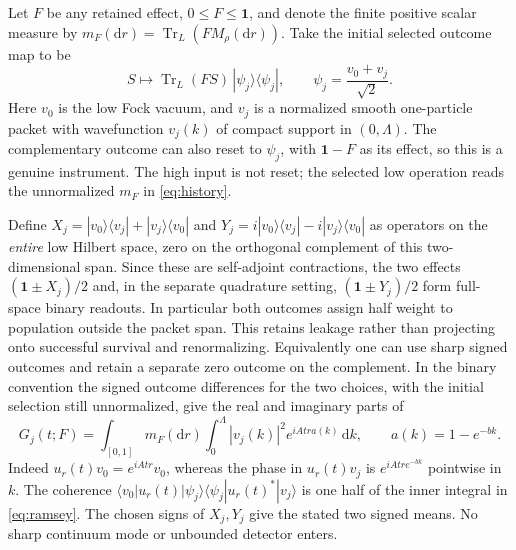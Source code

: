 \documentclass[11pt]{article}
\newcommand{\tr}{\operatorname{Tr}}
\newcommand{\dd}{\mathrm d}
\newcommand{\one}{\mathbf 1}
\newcommand{\vac}{v_0}
\newcommand{\ketbra}[2]{|#1\rangle\langle #2|}
\begin{document}
Let \(F\) be any retained effect, \(0\leq F\leq \one\), and denote the finite positive scalar measure by \(m_F(\dd r)=\tr_L(FM_\rho(\dd r))\). Take the initial selected outcome map to be
\begin{equation}
 S\longmapsto \tr_L(FS)\,\ketbra{\psi_j}{\psi_j},\qquad
 \psi_j=\frac{\vac+v_j}{\sqrt2}.
 \label{eq:reset}
\end{equation}
Here \(\vac\) is the low Fock vacuum, and \(v_j\) is a normalized smooth one-particle packet with wavefunction \(v_j(k)\) of compact support in \((0,\Lambda)\). The complementary outcome can also reset to \(\psi_j\), with \(\one-F\) as its effect, so this is a genuine instrument. The high input is not reset; the selected low operation reads the unnormalized \(m_F\) in \eqref{eq:history}.

Define \(X_j=\ketbra{\vac}{v_j}+\ketbra{v_j}{\vac}\) and
\(Y_j=i\ketbra{\vac}{v_j}-i\ketbra{v_j}{\vac}\) as operators on the \emph{entire} low Hilbert space, zero on the orthogonal complement of this two-dimensional span. Since these are self-adjoint contractions, the two effects \((\one\pm X_j)/2\) and, in the separate quadrature setting, \((\one\pm Y_j)/2\) form full-space binary readouts. In particular both outcomes assign half weight to population outside the packet span. This retains leakage rather than projecting onto successful survival and renormalizing. Equivalently one can use sharp signed outcomes and retain a separate zero outcome on the complement. In the binary convention the signed outcome differences for the two choices, with the initial selection still unnormalized, give the real and imaginary parts of
\begin{equation}
  G_j(t;F)
   = \int_{[0,1]} m_F(\dd r)
      \int_{0}^\Lambda |v_j(k)|^2 e^{iAt r a(k)}\,\dd k,\qquad
      a(k)=1-e^{-bk}.
 \label{eq:ramsey}
\end{equation}
Indeed \(u_r(t)\vac=e^{iAtr}\vac\), whereas the phase in \(u_r(t)v_j\) is \(e^{iAtr e^{-bk}}\) pointwise in \(k\). The coherence \(\langle \vac|u_r(t)\ketbra{\psi_j}{\psi_j}u_r(t)^*|v_j\rangle\) is one half of the inner integral in \eqref{eq:ramsey}. The chosen signs of \(X_j,Y_j\) give the stated two signed means. No sharp continuum mode or unbounded detector enters.
\end{document}
